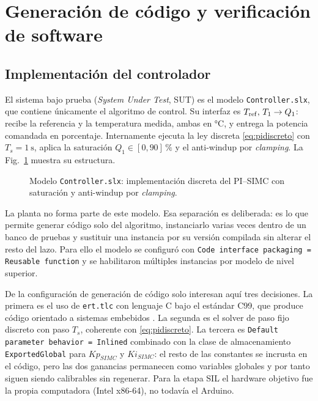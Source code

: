 \section{Generación de código y verificación de software}

\subsection{Implementación del controlador}

El sistema bajo prueba (\emph{System Under Test}, SUT) es el modelo \texttt{Controller.slx}, que
contiene únicamente el algoritmo de control. Su interfaz es
$T_{\mathrm{ref}},\,T_1 \rightarrow Q_1$: recibe la referencia y la temperatura medida, ambas en
\si{\celsius}, y entrega la potencia comandada en porcentaje. Internamente ejecuta la ley discreta
\eqref{eq:pidiscreto} con $T_s = \SI{1}{\second}$, aplica la saturación
$Q_1 \in [0,90]\,\si{\percent}$ y el anti-windup por \emph{clamping}. La Fig.~\ref{fig:controller}
muestra su estructura.


\begin{figure}[!t]
\centering
\caption{Modelo \texttt{Controller.slx}: implementación discreta del PI--SIMC con saturación y
anti-windup por \emph{clamping}.}
\label{fig:controller}
\end{figure}

La planta no forma parte de este modelo. Esa separación es deliberada: es lo que permite generar
código solo del algoritmo, instanciarlo varias veces dentro de un banco de pruebas y sustituir una
instancia por su versión compilada sin alterar el resto del lazo. Para ello el modelo se configuró
con \texttt{Code interface packaging = Reusable function} y se habilitaron múltiples instancias por
modelo de nivel superior.

De la configuración de generación de código solo interesan aquí tres decisiones. La primera es el
uso de \texttt{ert.tlc} con lenguaje C bajo el estándar C99, que produce código orientado a sistemas
embebidos \cite{mw_codegen}. La segunda es el solver de paso fijo discreto con paso $T_s$, coherente
con \eqref{eq:pidiscreto}. La tercera es \texttt{Default parameter behavior = Inlined} combinado con
la clase de almacenamiento \texttt{ExportedGlobal} para $Kp_{SIMC}$ y $Ki_{SIMC}$: el resto de las
constantes se incrusta en el código, pero las dos ganancias permanecen como variables globales y por
tanto siguen siendo calibrables sin regenerar. Para la etapa SIL el hardware objetivo fue la propia
computadora (Intel x86-64), no todavía el Arduino.

